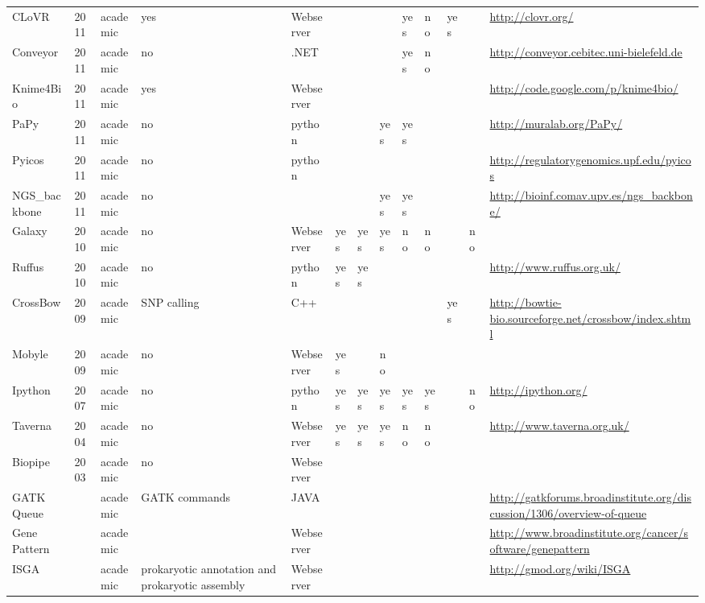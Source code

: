 \documentclass{article}
\begin{document}
\begin{landscape}
\begin{table}[htdp]
\begin{center}
\begin{tabular}{|p{2cm}|p{0.6cm}|p{1cm}|p{2cm}|p{1cm}|p{1cm}|p{1cm}|p{1cm}|p{1cm}|p{1cm}|p{1cm}|p{1cm}|p{4cm}|}
CLoVR~\cite{Angiuoli2011} & 2011 & academic & yes & Webserver &  &  &  & yes & no & yes &  & \url{http://clovr.org/} \\
Conveyor~\cite{Linke2011} & 2011 & academic & no & .NET &  &  &  & yes & no &  &  & \url{http://conveyor.cebitec.uni-bielefeld.de} \\
Knime4Bio~\cite{Lindenbaum2011} & 2011 & academic & yes & Webserver &  &  &  &  &  &  &  & \url{http://code.google.com/p/knime4bio/} \\
PaPy~\cite{Cieslik2011} & 2011 & academic & no & python &  &  & yes & yes &  &  &  & \url{http://muralab.org/PaPy/} \\
Pyicos~\cite{Althammer2011} & 2011 & academic & no & python &  &  &  &  &  &  &  & \url{http://regulatorygenomics.upf.edu/pyicos} \\
NGS\_backbone~\cite{Blanca2011} & 2011 & academic & no &  &  &  & yes & yes &  &  &  & \url{http://bioinf.comav.upv.es/ngs\_backbone/} \\
Galaxy~\cite{Goecks2010} & 2010 & academic & no & Webserver & yes & yes & yes & no & no &  & no &  \\
Ruffus~\cite{Goodstadt2010} & 2010 & academic & no & python & yes & yes &  &  &  &  &  & \url{http://www.ruffus.org.uk/} \\
CrossBow~\cite{Langmead2009} & 2009 & academic & SNP calling & C++ &  &  &  &  &  & yes &  & \url{http://bowtie-bio.sourceforge.net/crossbow/index.shtml} \\
Mobyle~\cite{Neron2009} & 2009 & academic & no & Webserver & yes &  & no &  &  &  &  &  \\
Ipython~\cite{Perez2007} & 2007 & academic & no & python & yes & yes & yes & yes & yes &  & no & \url{http://ipython.org/} \\
Taverna~\cite{Oinn2004} & 2004 & academic & no & Webserver & yes & yes & yes & no & no &  &  & \url{http://www.taverna.org.uk/} \\
Biopipe~\cite{Hoon2003} & 2003 & academic & no & Webserver &  &  &  &  &  &  &  &  \\
GATK Queue &  & academic & GATK commands & JAVA &  &  &  &  &  &  &  & \url{http://gatkforums.broadinstitute.org/discussion/1306/overview-of-queue} \\
Gene Pattern &  & academic &  & Webserver &  &  &  &  &  &  &  & \url{http://www.broadinstitute.org/cancer/software/genepattern} \\
ISGA &  & academic & prokaryotic annotation and prokaryotic assembly & Webserver &  &  &  &  &  &  &  & \url{http://gmod.org/wiki/ISGA} \\

\end{tabular}
\end{center}
\end{table}
\end{landscape}
\end{document}
